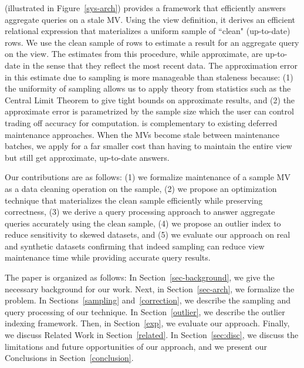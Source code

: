 \svcfull (\svc illustrated in Figure~\ref{sys-arch}) provides a framework that efficiently answers aggregate queries on a stale MV.
Using the view definition, it derives an efficient relational expression that materializes a uniform sample of ``clean" (up-to-date) rows.
We use the clean sample of rows to estimate a result for an aggregate query on the view.
The estimates from this procedure, while approximate, are up-to-date in the sense that they reflect the most recent data. 
The approximation error in this estimate due to sampling is more manageable than staleness because: (1) the uniformity of sampling allows us to apply theory from statistics such as the Central Limit Theorem to give tight bounds on approximate results, and (2) the approximate error is parametrized by the sample size which the user can control trading off accuracy for computation.
\svc is complementary to existing deferred maintenance approaches.
When the MVs become stale between maintenance batches, we apply \svc for a far smaller cost than having to maintain the entire view but still get approximate, up-to-date answers.

Our contributions are as follows: (1) we formalize maintenance of a sample MV as a data cleaning operation on the sample, (2) we propose an optimization technique that materializes the clean sample efficiently while preserving correctness, (3) we derive a query processing approach to answer aggregate queries accurately using the clean sample, (4) we propose an outlier index to reduce sensitivity to skewed datasets, and (5) we evaluate our approach on real and synthetic datasets confirming that indeed sampling can reduce view maintenance time while providing accurate query results. 

The paper is organized as follows: 
In Section~\ref{sec-background}, we give the necessary background for our work.
Next, in Section~\ref{sec-arch}, we formalize the problem.
In Sections~\ref{sampling} and~\ref{correction}, we describe the sampling and query processing of our technique.
In Section~\ref{outlier}, we describe the outlier indexing framework.
Then, in Section~\ref{exp}, we evaluate our approach.
Finally, we discuss Related Work in Section~\ref{related}.
In Section~\ref{sec:disc}, we discuss the limitations and future opportunities of our approach, and we present our Conclusions in Section~\ref{conclusion}.
